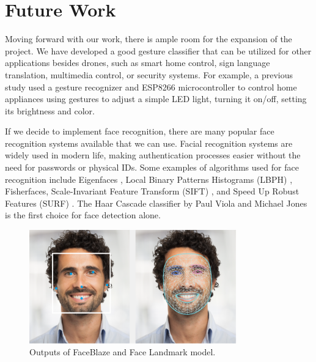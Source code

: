 \section{Future Work}
Moving forward with our work, there is ample room for the expansion of the project. We have developed a good gesture classifier that can be utilized for other applications besides drones, such as smart home control, sign language translation, multimedia control, or security systems. For example, a previous study \cite{doi:10.1080/08839514.2023.2176607} used a gesture recognizer and ESP8266 microcontroller to control home appliances using gestures to adjust a simple LED light, turning it on/off, setting its brightness and color.

If we decide to implement face recognition, there are many popular face recognition systems available that we can use. Facial recognition systems are widely used in modern life, making authentication processes easier without the need for passwords or physical IDs. Some examples of algorithms used for face recognition include Eigenfaces \cite{CARIKCI2012118}, Local Binary Patterns Histograms (LBPH) \cite{inproceedings}, Fisherfaces, Scale-Invariant Feature Transform (SIFT) \cite{articlefr}, and Speed Up Robust Features (SURF) \cite{10.1007/11744023_32}. The Haar Cascade classifier by Paul Viola and Michael Jones \cite{inproceedings} is the first choice for face detection alone.


\begin{figure}[h]
	\centering
	\includegraphics[width=0.8\textwidth]{images/face_landmark.png}
	\caption{Outputs of FaceBlaze and Face Landmark model.}
	\label{fig:face_landmark}
\end{figure}

\par~
\newline



